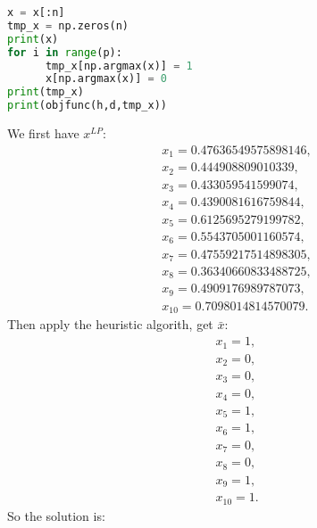 \documentclass[12pt]{article}
\begin{document}
\begin{enumerate}
\begin{enumerate}
\begin{lstlisting}[language=Python]
x = x[:n]
tmp_x = np.zeros(n)
print(x)
for i in range(p):
      tmp_x[np.argmax(x)] = 1
      x[np.argmax(x)] = 0
print(tmp_x)
print(objfunc(h,d,tmp_x))
                        \end{lstlisting}
                        We first have $x^{LP}$:
                        \begin{align*}
                               & x_{1} = 0.47636549575898146, \\
                               & x_{2} = 0.444908809010339,   \\
                               & x_{3} = 0.433059541599074,   \\
                               & x_{4} = 0.4390081616759844,  \\
                               & x_{5} = 0.6125695279199782,  \\
                               & x_{6} = 0.5543705001160574,  \\
                               & x_{7} = 0.47559217514898305, \\
                               & x_{8} = 0.36340660833488725, \\
                               & x_{9} = 0.4909176989787073,  \\
                               & x_{10} = 0.7098014814570079.
                        \end{align*}
                        Then apply the heuristic algorith, get
                        $\bar{x}$:
                        \begin{align*}
                               & x_1 = 1,    \\
                               & x_2 = 0,    \\
                               & x_3 = 0,    \\
                               & x_4 = 0,    \\
                               & x_5 = 1,    \\
                               & x_6 = 1,    \\
                               & x_7 = 0,    \\
                               & x_8 = 0,    \\
                               & x_9 = 1,    \\
                               & x_{10} = 1.
                        \end{align*}
                        So the solution is:
                        \begin{align*}

\end{align*}
\end{enumerate}
\end{enumerate}
\end{document}
